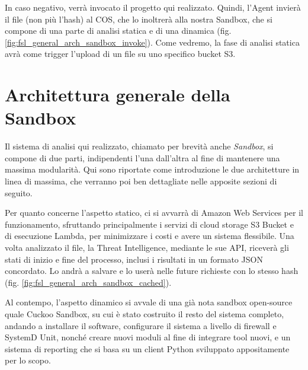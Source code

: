 In caso negativo, verrà invocato il progetto qui realizzato. Quindi, l'Agent invierà il file (non più l'hash) al COS, che lo inoltrerà alla nostra Sandbox, che si compone di una parte di analisi statica e di una dinamica (fig. \ref{fig:fsl_general_arch_sandbox_invoke}). Come vedremo, la fase di analisi statica avrà come trigger l'upload di un file su uno specifico bucket S3.

\section{Architettura generale della Sandbox}

Il sistema di analisi qui realizzato, chiamato per brevità anche \emph{Sandbox},
si compone di due parti, indipendenti l'una dall'altra al fine di mantenere una massima modularità.
Qui sono riportate come introduzione le due architetture in linea di massima, che verranno poi ben dettagliate nelle apposite sezioni di seguito.

Per quanto concerne l'aspetto statico, ci si avvarrà di Amazon Web Services per il funzionamento,
sfruttando principalmente i servizi di cloud storage S3 Bucket e di esecuzione Lambda, per minimizzare i costi e avere un sistema flessibile.
Una volta analizzato il file, la Threat Intelligence, mediante le sue API, riceverà gli stati di inizio e fine del processo, inclusi i risultati in un formato JSON concordato. Lo andrà a salvare e lo userà nelle future richieste con lo stesso hash (fig. \ref{fig:fsl_general_arch_sandbox_cached}).

Al contempo, l'aspetto dinamico si avvale di una già nota sandbox open-source quale Cuckoo Sandbox,
su cui è stato costruito il resto del sistema completo,
andando a installare il software, configurare il sistema a livello di firewall e SystemD Unit,
nonché creare nuovi moduli al fine di integrare tool nuovi, e un sistema di reporting che si basa su un client Python sviluppato appositamente per lo scopo.

